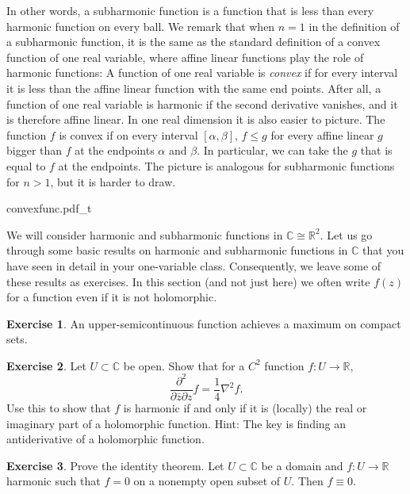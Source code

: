\documentclass[12pt,openany]{book}
\newcommand{\C}{{\mathbb{C}}}
\newcommand{\R}{{\mathbb{R}}}
\theoremstyle{plain}
\theoremstyle{remark}
\theoremstyle{definition}
\newenvironment{exbox}{%
    \def\FrameCommand{\vrule width 1pt \relax\hspace{10pt}}%
    \MakeFramed {\advance \hsize -\width \FrameRestore}%
}{%
    \endMakeFramed
}
\newenvironment{myfig}{%
    \begin{center}
}{%
    \end{center}
}
\theoremstyle{exercise}
\newtheorem{exercise}{Exercise}[section]
\theoremstyle{example}
\begin{document}
In other words, a subharmonic function is a function that is less than every
harmonic function on every ball.
We remark that when $n=1$ in the definition of a subharmonic function,
it is the same as the standard definition of a
convex function of one real variable, where affine linear functions play the role of harmonic
functions: A function of one real variable is
\emph{convex} if 
for every interval it is less than the affine linear function with the same
end points.
After all, a function of one real variable is harmonic if the second
derivative vanishes, and it is therefore affine linear.
In one real dimension it is also easier to picture.
The function $f$ is convex if on
every interval $[\alpha,\beta]$, $f \leq g$ for every affine linear $g$
bigger than $f$ at the endpoints $\alpha$ and $\beta$.  In particular, we can
take the $g$ that is equal to $f$ at the endpoints.
The picture is analogous for subharmonic functions for $n > 1$,
but it is harder to draw.

\begin{myfig}
{convexfunc.pdf_t}
\end{myfig}

We will consider harmonic and subharmonic functions in $\C \cong
\R^2$.
Let us go through some basic results on harmonic and subharmonic
functions in $\C$ that you have seen in detail in your one-variable class.
Consequently, we leave some of these results as exercises.
In this section (and not just here)
we often write $f(z)$ for a function
even if it is not holomorphic.

\begin{exbox}
\begin{exercise}
An upper-semicontinuous function achieves a maximum on compact sets.
\end{exercise}

\begin{exercise}
Let $U \subset \C$ be open.
Show that for a $C^2$ function $f \colon U \to \R$,
\begin{equation*}
\frac{\partial^2}{\partial \bar{z}\partial z} f = \frac{1}{4} \nabla^2 f .
\end{equation*}
Use this to show that $f$ is harmonic if and only if it is
(locally) the real or imaginary part
of a holomorphic function.
Hint: The key is finding an antiderivative of a holomorphic function.
\end{exercise}

\begin{exercise}
Prove the identity theorem.  Let $U \subset \C$ be a domain
and $f \colon U \to \R$ harmonic such that $f=0$ on a nonempty open subset
of $U$.  Then $f\equiv 0$.
\end{exercise}
\end{exbox}
\end{document}
